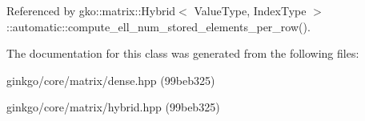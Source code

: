 Referenced by gko\+::matrix\+::\+Hybrid$<$ Value\+Type, Index\+Type $>$\+::automatic\+::compute\+\_\+ell\+\_\+num\+\_\+stored\+\_\+elements\+\_\+per\+\_\+row().



The documentation for this class was generated from the following files\+:\begin{DoxyCompactItemize}
\item 
ginkgo/core/matrix/dense.\+hpp (99beb325)\item 
ginkgo/core/matrix/hybrid.\+hpp (99beb325)\end{DoxyCompactItemize}
